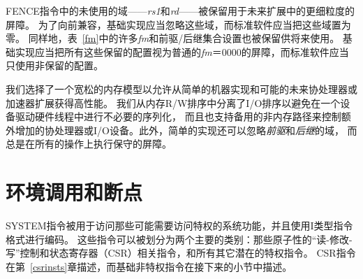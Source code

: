 FENCE指令中的未使用的域——{\em rs1}和{\em rd}——被保留用于未来扩展中的更细粒度的屏障。
为了向前兼容，基础实现应当忽略这些域，而标准软件应当把这些域置为零。
同样地，表~\ref{fm}中的许多{\em fm}和前驱/后继集合设置也被保留供将来使用。
基础实现应当把所有这些保留的配置视为普通的{\em fm}＝0000的屏障，而标准软件应当只使用非保留的配置。

\begin{commentary}
我们选择了一个宽松的内存模型以允许从简单的机器实现和可能的未来协处理器或加速器扩展获得高性能。
我们从内存R/W排序中分离了I/O排序以避免在一个设备驱动硬件线程中进行不必要的序列化，
而且也支持备用的非内存路径来控制额外增加的协处理器或I/O设备。此外，简单的实现还可以忽略{\em 前驱}和{\em 后继}的域，
而总是在所有的操作上执行保守的屏障。
\end{commentary}

\section{环境调用和断点}

SYSTEM指令被用于访问那些可能需要访问特权的系统功能，并且使用I类型指令格式进行编码。
这些指令可以被划分为两个主要的类别：那些原子性的“读-修改-写”控制和状态寄存器（CSR）相关指令，和所有其它潜在的特权指令。
CSR指令在第~\ref{csrinsts}章描述，而基础非特权指令在接下来的小节中描述。

